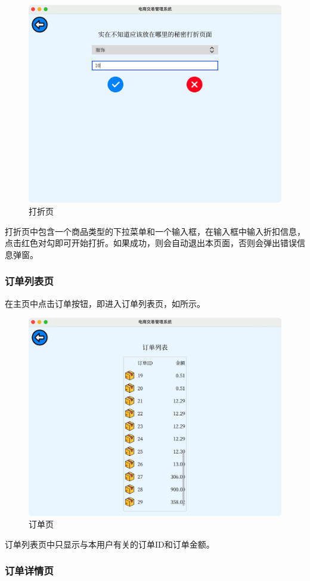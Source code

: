\documentclass[lang=cn,11pt,a4paper,cite=authornum]{paper}
\begin{document}
\begin{figure}[htbp]
    \centering
    \includegraphics[width=0.7\linewidth]{./Images/discount.png}
    \caption{打折页\label{fig:discount}}
\end{figure}

打折页中包含一个商品类型的下拉菜单和一个输入框，在输入框中输入折扣信息，点击红色对勾即可开始打折。如果成功，则会自动退出本页面，否则会弹出错误信息弹窗。

\subsubsection{订单列表页}

在主页中点击订单按钮，即进入订单列表页，如所示。

\begin{figure}[htbp]
    \centering
    \includegraphics[width=0.7\linewidth]{./Images/orderlist.png}
    \caption{订单页\label{fig:orderlist}}
\end{figure}

订单列表页中只显示与本用户有关的订单ID和订单金额。

\subsubsection{订单详情页}
\end{document}
